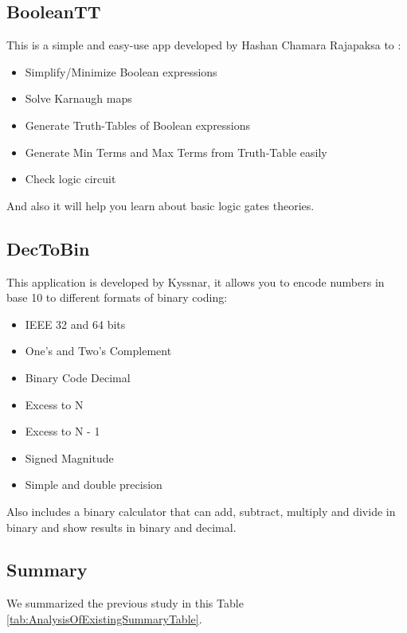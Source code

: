  
 
 \subsection{BooleanTT }
 This is a simple and easy-use app developed by Hashan Chamara Rajapaksa to :
 \begin{itemize}
	 \item Simplify/Minimize Boolean expressions
	 \item Solve Karnaugh maps
	 \item Generate Truth-Tables of Boolean expressions
	 \item Generate Min Terms and Max Terms from Truth-Table easily
	 \item Check logic circuit
 \end{itemize}
 And also it will help you learn about basic logic gates theories.\cite{BooleanTT}
 
 \subsection{DecToBin }
 This application is developed by Kyssnar, it allows you to encode numbers in base 10 to different formats of binary coding:
 \begin{itemize}
	\item IEEE 32 and 64 bits
	\item One's and Two's Complement
	\item Binary Code Decimal
	\item Excess to N
	\item Excess to N - 1
	\item Signed Magnitude
	\item Simple and double precision
\end{itemize}
 Also includes a binary calculator that can add, subtract, multiply and divide in binary and show results in binary and decimal.\cite{dectobin}
 
 \subsection{Summary }
We summarized the previous study in this Table \ref{tab:AnalysisOfExistingSummaryTable}.

